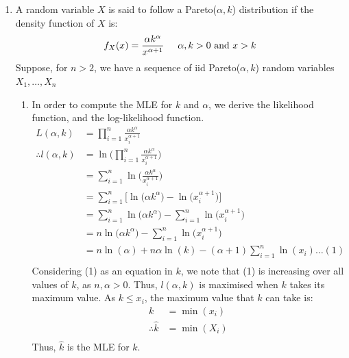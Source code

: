 \documentclass[a4paper]{article}
\newcommand{\ds}{\displaystyle}
\begin{document}
\begin{enumerate}
\begin{enumerate}
	\end{enumerate}

	\pagebreak

	\item A random variable $\ds{X}$ is said to follow a Pareto($\ds{\alpha, k}$) distribution if the density function of $\ds{X}$ is:
	\begin{align*}
		f_X(x) & = \frac{\alpha k^{\alpha}}{x^{\alpha + 1}} \hspace{5mm} \alpha,k > 0 \text{ and } x > k\\
	\end{align*} 
	Suppose, for $\ds{n > 2}$, we have a sequence of iid Pareto($\ds{\alpha, k}$) random variables $\ds{X_1, \dots, X_n}$
	\begin{enumerate}

		\item In order to compute the MLE for $\ds{k}$ and $\ds{\alpha}$, we derive the likelihood function, and the log-likelihood function.
		\begin{align*}
			L(\alpha,k) & = \prod^n_{i=1}\frac{\alpha k^{\alpha}}{x_i^{\alpha + 1}}\\
			\therefore l(\alpha,k) & = \ln \Bigg(\prod^n_{i=1}\frac{\alpha k^{\alpha}}{x_i^{\alpha + 1}} \Bigg)\\
			& = \sum^n_{i=1}\ln \bigg(\frac{\alpha k^{\alpha}}{x_i^{\alpha + 1}} \bigg)\\
			& = \sum^n_{i=1}\Big[\ln \big(\alpha k^{\alpha} \big) - \ln \big(x_i^{\alpha + 1} \big) \Big]\\
			& = \sum^n_{i=1}\ln \big(\alpha k^{\alpha} \big) - \sum^n_{i=1} \ln \big(x_i^{\alpha + 1} \big)\\
			& = n\ln \big(\alpha k^{\alpha} \big) - \sum^n_{i=1} \ln \big(x_i^{\alpha + 1} \big)\\
			& = n\ln(\alpha) + n\alpha \ln(k) - (\alpha + 1)\sum^n_{i=1}\ln(x_i) \dots (1)\\
		\end{align*}
		Considering (1) as an equation in $\ds{k}$, we note that (1) is increasing over all values of $\ds{k}$, as $\ds{n,\alpha > 0}$. Thus, $\ds{l(\alpha,k)}$ is maximised when $\ds{k}$ takes its maximum value. As $\ds{k \leq x_i}$, the maximum value that $\ds{k}$ can take is:
		\begin{align*}
			k & = \min(x_i) \\
			\therefore \widehat{k} & = \min(X_i) \\
		\end{align*}
		Thus, $\ds{\widehat{k}}$ is the MLE for $\ds{k}$.


\end{enumerate}
\end{enumerate}
\end{document}
